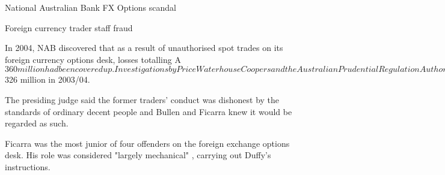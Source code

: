 National Australian Bank FX Options scandal



Foreign currency trader staff fraud

In 2004, NAB discovered that as a result of unauthorised spot trades on its foreign currency options desk, losses totalling A$360 million had been covered up. Investigations by Price Waterhouse Coopers and the Australian Prudential Regulation Authority highlighted a need for cultural change. The losses were a result of a failed speculative position where the traders falsified profits to trigger bonuses over a number of years. 

In order to actually generate the reported profits, the traders speculated on the US dollar, betting that it would rise against the Australian dollar and other currencies. 

In 2006, two former NAB foreign currency options traders were sentenced on charges brought by ASIC and incurred jail terms.
 
Convictions
Ficarra and Bullenwere found guilty in May on a string of charges related to the unauthorised trading on NAB's foreign exchange options desk, which cost the bank $326 million in 2003/04.
 
The presiding judge said the former traders' conduct was dishonest by the standards of ordinary decent people and Bullen and Ficarra knew it would be regarded as such.
 


 
 Ficarra was the most junior of four offenders on the foreign exchange options desk. His role was considered "largely mechanical" , carrying out Duffy's instructions.
